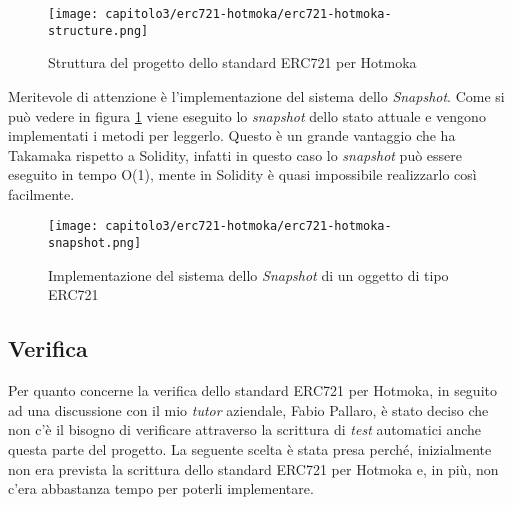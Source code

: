 \begin{figure}[h!]
  \centering
  \texttt{[image: capitolo3/erc721-hotmoka/erc721-hotmoka-structure.png]}
  \caption{Struttura del progetto dello standard ERC721 per Hotmoka}
\end{figure}

\noindent Meritevole di attenzione è l'implementazione del sistema dello \textit{Snapshot}. Come si può vedere in figura \ref{fig:erc721-snapshot} viene eseguito lo \textit{snapshot} dello stato attuale e vengono implementati i metodi per leggerlo. Questo è un grande vantaggio che ha Takamaka rispetto a Solidity, infatti in questo caso lo \textit{snapshot} può essere eseguito in tempo O(1), mente in Solidity è quasi impossibile realizzarlo così facilmente.

\begin{figure}[h!]
  \centering
  \texttt{[image: capitolo3/erc721-hotmoka/erc721-hotmoka-snapshot.png]}
  \caption{Implementazione del sistema dello \textit{Snapshot} di un oggetto di tipo ERC721}
  \label{fig:erc721-snapshot}
\end{figure}


\subsection{Verifica}
Per quanto concerne la verifica dello standard ERC721 per Hotmoka, in seguito ad una discussione con il mio \textit{tutor} aziendale, Fabio Pallaro, è stato deciso che non c'è il bisogno di verificare attraverso la scrittura di \textit{test} automatici anche questa parte del progetto. La seguente scelta è stata presa perché, inizialmente non era prevista la scrittura dello standard ERC721 per Hotmoka e, in più, non c'era abbastanza tempo per poterli implementare.
